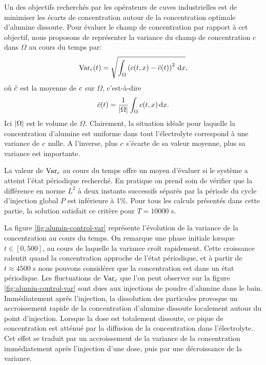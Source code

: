 Un des objectifs recherchés par les opérateurs de cuves
industrielles est de minimiser les écarts de concentration autour de
la concentration optimale d'alumine dissoute. Pour évaluer le champ
de concentration par rapport à cet objectif, nous proposons de
représenter la variance  du champ de concentration
$c$ dans $\Omega$ au cours du temps par:
\begin{equation}
  \operatorname{Var}_c(t) = \sqrt{\int_\Omega\left( c(t, x) - \bar {c}(t) \right)^2\,\mathrm dx},
\end{equation}
où $\bar {c}$ est la moyenne de $c$ sur
$\Omega$, c'est-à-dire
\begin{equation}
  \bar {c}(t) = \frac{1}{\left\lvert \Omega \right\rvert}\int_\Omega c(t, x)\,\mathrm dx.
\end{equation}
Ici $\left\lvert \Omega \right\rvert$ est le volume de $\Omega$. Clairement, la situation
idéale pour laquelle la concentration d'alumine est uniforme dans tout
l'électrolyte correspond à une variance de $c$ nulle. A
l'inverse, plus $c$ s'écarte de sa valeur moyenne, plus
sa variance est importante.

La valeur de $\operatorname{Var}_c$ au cours du temps offre un moyen
d'évaluer si le système a atteint l'état périodique
recherché. En pratique on prend soin de
vérifier que la différence en norme $L^2$ à deux instants successifs
séparés par la période du cycle d'injection global $P$ est inférieure
à \num{1}\%. Pour tous les calculs présentés dans cette partie, la
solution satisfait ce critère pour $T = \num{10000}$ \si{\second}.

La figure \ref{fig:alumin-control-var} représente l'évolution de
la variance de la concentration au cours du temps. On remarque une
phase initiale lorsque $t\in[0,500]$, au cours de laquelle la variance
croît rapidement. Cette croissance ralentit quand la concentration
approche de l'état périodique, et à partir de $t \approx
\num{4500}$ \si{\second} nous pouvons considérer que la
concentration est dans un état périodique. Les
fluctuations de $\operatorname{Var}_c$ que l'on peut observer sur la
figure \ref{fig:alumin-control-var} sont dues aux injections de poudre
d'alumine dans le bain. Immédiatement après l'injection, la
dissolution des particules provoque un accroissement rapide de la
concentration d'alumine dissoute localement autour du point
d'injection. Lorsque la dose est totalement dissoute, ce pique de
concentration est atténué par la diffusion de la concentration
dans l'électrolyte. Cet effet se traduit par un accroissement de la
variance de la concentration immédiatement après l'injection d'une
dose, puis par une décroissance de la variance.


